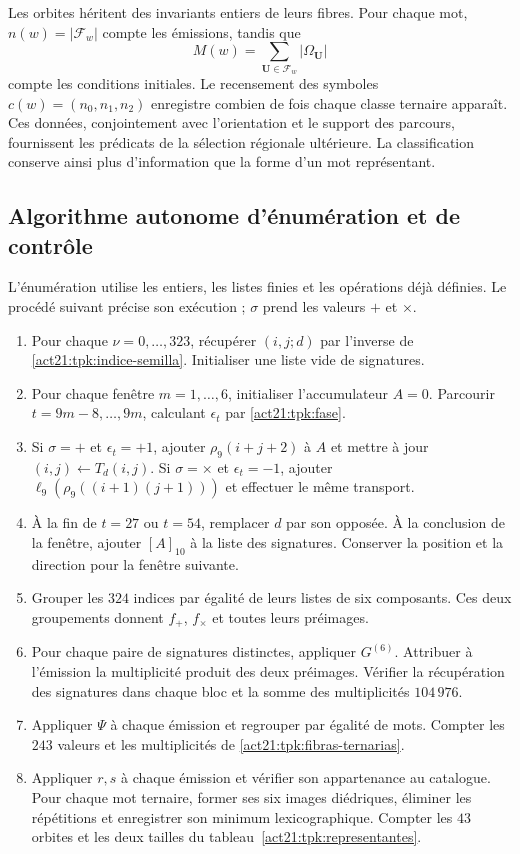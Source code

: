 Les orbites héritent des invariants entiers de leurs fibres. Pour chaque mot,
\(n(w)=|\mathcal F_w|\) compte les émissions, tandis que
\[
 M(w)=\sum_{\mathbf U\in\mathcal F_w}|\Omega_{\mathbf U}|
\]
compte les conditions initiales. Le recensement des symboles
\(c(w)=(n_0,n_1,n_2)\) enregistre combien de fois chaque classe ternaire apparaît.
Ces données, conjointement avec l'orientation et le support des parcours,
fournissent les prédicats de la sélection régionale ultérieure. La
classification conserve ainsi plus d'information que la forme d'un mot
représentant.

\subsection{Algorithme autonome d'énumération et de contrôle}
\label{act21:tpk:algoritmo}

L'énumération utilise les entiers, les listes finies et les opérations déjà définies.  
Le procédé suivant précise son exécution ; \(\sigma\) prend les valeurs  
\(+\) et \(\times\).

\begin{enumerate}
\item Pour chaque \(\nu=0,\ldots,323\), récupérer \((i,j;d)\) par
l'inverse de \eqref{act21:tpk:indice-semilla}. Initialiser une liste vide de signatures.
\item Pour chaque fenêtre \(m=1,\ldots,6\), initialiser l'accumulateur \(A=0\).
Parcourir \(t=9m-8,\ldots,9m\), calculant \(\epsilon_t\) par
\eqref{act21:tpk:fase}.
\item Si \(\sigma=+\) et \(\epsilon_t=+1\), ajouter
\(\rho_9(i+j+2)\) à \(A\) et mettre à jour
\((i,j)\leftarrow T_d(i,j)\). Si \(\sigma=\times\) et
\(\epsilon_t=-1\), ajouter
\(\ell_9(\rho_9((i+1)(j+1)))\) et effectuer le même transport.
\item À la fin de \(t=27\) ou \(t=54\), remplacer \(d\) par son opposée.  
À la conclusion de la fenêtre, ajouter \([A]_{10}\) à la liste des signatures.  
Conserver la position et la direction pour la fenêtre suivante.
\item Grouper les \(324\) indices par égalité de leurs listes de six
composants. Ces deux groupements donnent \(f_+\), \(f_\times\) et toutes
leurs préimages.
\item Pour chaque paire de signatures distinctes, appliquer \(G^{(6)}\).
Attribuer à l'émission la multiplicité produit des deux préimages.
Vérifier la récupération des signatures dans chaque bloc et la somme des
multiplicités \(104\,976\).
\item Appliquer \(\Psi\) à chaque émission et regrouper par égalité de mots.
Compter les \(243\) valeurs et les multiplicités de
\eqref{act21:tpk:fibras-ternarias}.
\item Appliquer \(r,s\) à chaque émission et vérifier son appartenance au catalogue.
Pour chaque mot ternaire, former ses six images diédriques, éliminer les
répétitions et enregistrer son minimum lexicographique. Compter les \(43\)
orbites et les deux tailles du tableau~\ref{act21:tpk:representantes}.
\end{enumerate}

